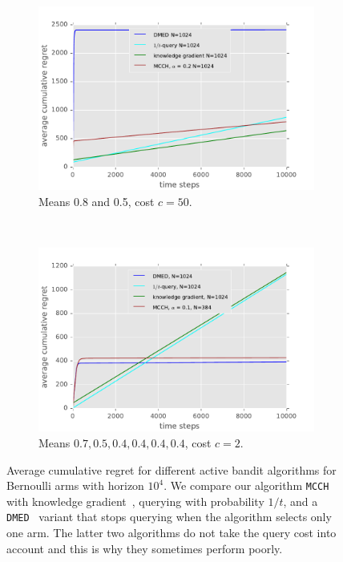 \documentclass{article}
\begin{document}
\begin{figure}[t]
\centering
\begin{subfigure}[b]{0.48\textwidth}
\centering
\includegraphics[width=\textwidth]{regret50.pdf}
\caption{Means 0.8 and 0.5, cost $c = 50$.}
\label{fig:regret50}
\end{subfigure}%
~ 
\begin{subfigure}[b]{0.48\textwidth}
\centering
\includegraphics[width=\textwidth]{regret2.pdf}
\caption{Means $0.7, 0.5, 0.4, 0.4, 0.4, 0.4$, cost $c = 2$.}
\label{fig:regret2}
\end{subfigure}
\caption{
Average cumulative regret for different active bandit algorithms
for Bernoulli arms with horizon $10^4$.
We compare our algorithm \texttt{MCCH} with
knowledge gradient~\citep[Ch.~5]{PowellRyzhov12},
querying with probability $1/t$, and
a \texttt{DMED}~\citep{Honda10} variant that stops querying when
the algorithm selects only one arm.
The latter two algorithms do not take the query cost into account
and this is why they sometimes perform poorly.
}
\label{fig:regret}
\end{figure}
\end{document}
